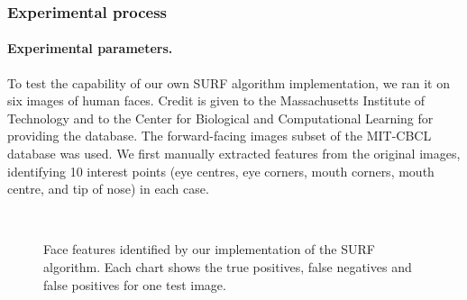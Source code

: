 \subsubsection{Experimental process}

\paragraph{Experimental parameters.}
To test the capability of our own SURF algorithm implementation, we ran it on six images of human faces. Credit is given to the Massachusetts Institute of Technology and to the Center for Biological and Computational Learning \cite{database} for providing the database. The forward-facing images subset of the MIT-CBCL database was used. We first manually extracted features from the original images, identifying 10 interest points (eye centres, eye corners, mouth corners, mouth centre, and tip of nose) in each case.

\begin{figure} [h]
  \centering
  \\
  \caption[Face features identified by our SURF implementation (images 1 \& 2)]{Face features identified by our implementation of the SURF algorithm. Each chart shows the true positives, false negatives and false positives for one test image.}
  \label{fig:face-features-hits-1}
\end{figure}

